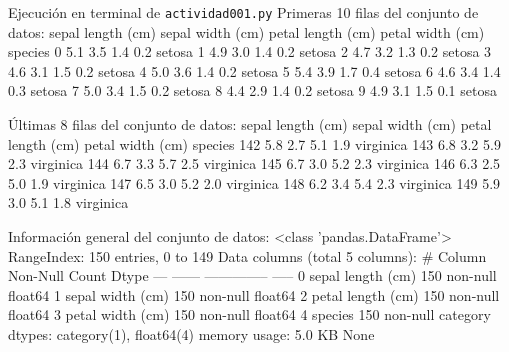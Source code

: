 \documentclass[11pt,letterpaper]{article}
\begin{document}
\begin{consola}[label=out:iris]{Ejecución en terminal de \texttt{actividad001.py}}
Primeras 10 filas del conjunto de datos:
   sepal length (cm)  sepal width (cm)  petal length (cm)  petal width (cm) species
0                5.1               3.5                1.4               0.2  setosa
1                4.9               3.0                1.4               0.2  setosa
2                4.7               3.2                1.3               0.2  setosa
3                4.6               3.1                1.5               0.2  setosa
4                5.0               3.6                1.4               0.2  setosa
5                5.4               3.9                1.7               0.4  setosa
6                4.6               3.4                1.4               0.3  setosa
7                5.0               3.4                1.5               0.2  setosa
8                4.4               2.9                1.4               0.2  setosa
9                4.9               3.1                1.5               0.1  setosa



Últimas 8 filas del conjunto de datos:
     sepal length (cm)  sepal width (cm)  petal length (cm)  petal width (cm)    species
142                5.8               2.7                5.1               1.9  virginica
143                6.8               3.2                5.9               2.3  virginica
144                6.7               3.3                5.7               2.5  virginica
145                6.7               3.0                5.2               2.3  virginica
146                6.3               2.5                5.0               1.9  virginica
147                6.5               3.0                5.2               2.0  virginica
148                6.2               3.4                5.4               2.3  virginica
149                5.9               3.0                5.1               1.8  virginica



Información general del conjunto de datos:
<class 'pandas.DataFrame'>
RangeIndex: 150 entries, 0 to 149
Data columns (total 5 columns):
 #   Column             Non-Null Count  Dtype   
---  ------             --------------  -----   
 0   sepal length (cm)  150 non-null    float64 
 1   sepal width (cm)   150 non-null    float64 
 2   petal length (cm)  150 non-null    float64 
 3   petal width (cm)   150 non-null    float64 
 4   species            150 non-null    category
dtypes: category(1), float64(4)
memory usage: 5.0 KB
None




\end{consola}
\end{document}

